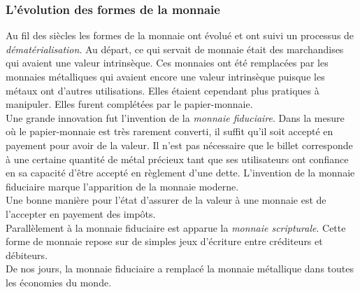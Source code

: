 \documentclass[10pt]{book}
\begin{document}
\subsubsection{L'évolution des formes de la monnaie}
Au fil des siècles les formes de la monnaie ont évolué et ont suivi un processus de \textit{dématérialisation}. Au départ, ce qui servait de monnaie était des marchandises qui avaient une valeur intrinsèque. Ces monnaies ont été remplacées par les monnaies métalliques qui avaient encore une valeur intrinsèque puisque les métaux ont d'autres utilisations. Elles étaient cependant plus pratiques à manipuler. Elles furent complétées par le papier-monnaie. \\
Une grande innovation fut l'invention de la \textit{monnaie fiduciaire}. Dans la mesure où le papier-monnaie est très rarement converti, il suffit qu'il soit accepté en payement pour avoir de la valeur. Il n'est pas nécessaire que le billet corresponde à une certaine quantité de métal précieux tant que ses utilisateurs ont confiance en sa capacité d'être accepté en règlement d'une dette. L'invention de la monnaie fiduciaire marque l'apparition de la monnaie moderne. \\
Une bonne manière pour l'état d'assurer de la valeur à une monnaie est de l'accepter en payement des impôts. \\
Parallèlement à la monnaie fiduciaire est apparue la \textit{monnaie scripturale}. Cette forme de monnaie repose sur de simples jeux d'écriture entre créditeurs et débiteurs. \\
De nos jours, la monnaie fiduciaire a remplacé la monnaie métallique dans toutes les économies du monde.
\end{document}
